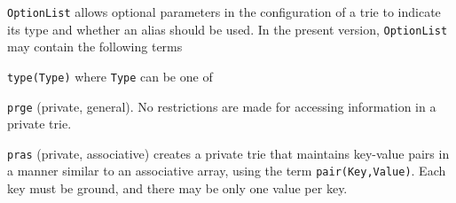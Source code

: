 \begin{description}
%
%
{\tt OptionList} allows optional parameters in the configuration of a
trie to indicate its type and whether an alias should be used.  In the
present version, {\tt OptionList} may contain the following terms
\bi
\item {\tt type(Type)} where {\tt Type} can be one of
\bi
\item {\tt prge} (private, general).
  No restrictions are made for accessing information in a private
  trie.

\item {\tt pras} (private, associative) creates a private trie that
  maintains key-value pairs in a manner similar to an associative
  array, using the term {\tt pair(Key,Value)}.  Each key must be ground,
  and there may be only one value per key.



\end{description}
